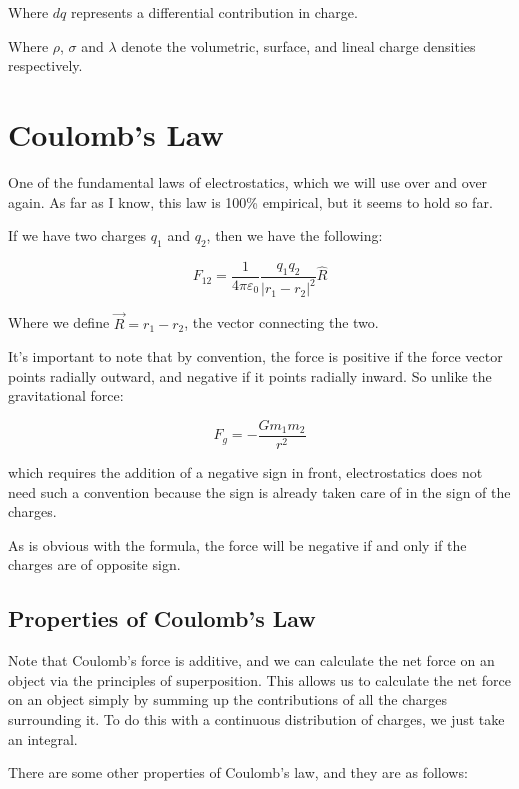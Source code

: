 \documentclass{report}
\theoremstyle{definition}
\numberwithin{equation}{section}
\numberwithin{definition}{section}
\begin{document}
Where $dq$ represents a differential contribution in charge. 

Where $\rho$, $\sigma$ and $\lambda$ denote the volumetric, surface, and lineal charge densities respectively. 

\section{Coulomb's Law}

    One of the fundamental laws of electrostatics, which we will use over and over again. As far as I know, this law is 100\% empirical, but it seems to hold so far.

    \begin{theorem}
        If we have two charges $q_1$ and $q_2$, then we have the following:

        \[ F_{12} = \frac{1}{4\pi\varepsilon_0} \frac{q_1q_2}{|r_1 - r_2|^2} \hat R\]

        Where we define $\vec{R} = r_1 - r_2$, the vector connecting the two.
    \end{theorem}

    It's important to note that by convention, the force is positive if the force vector points radially outward, and negative if it points radially inward. So unlike the gravitational force:
    
    \[ F_g = -\frac{Gm_1m_2}{r^2}\]

    which requires the addition of a negative sign in front, electrostatics does not need such a convention because the sign is already taken care of in the sign of the charges.

    As is obvious with the formula, the force will be negative if and only if the charges are of opposite sign. 

\subsection{Properties of Coulomb's Law}

    Note that Coulomb's force is additive, and we can calculate the net force on an object via the principles of superposition. This allows us to calculate the net force on an object simply by summing up the contributions of all the charges surrounding it. To do this with a continuous distribution of charges, we just take an integral. 

    There are some other properties of Coulomb's law, and they are as follows:
\end{document}

